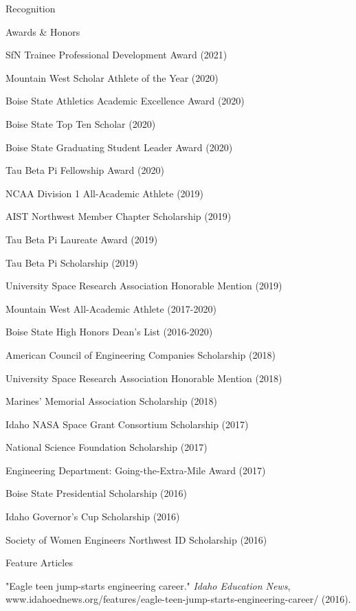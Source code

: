\documentclass{resume} %
\begin{document}
\newpage
\begin{rSection}{Recognition}
\begin{rSubsection2}{Awards \& Honors}{}{}{}
\item SfN Trainee Professional Development Award (2021)
\item Mountain West Scholar Athlete of the Year (2020)
\item Boise State Athletics Academic Excellence Award (2020) 
\item Boise State Top Ten Scholar (2020)
\item Boise State Graduating Student Leader Award (2020)
\item Tau Beta Pi Fellowship Award (2020)
\item NCAA Division 1 All-Academic Athlete (2019) 
\item AIST Northwest Member Chapter Scholarship (2019)
\item Tau Beta Pi Laureate Award (2019)
\item Tau Beta Pi Scholarship (2019)
\item University Space Research Association Honorable Mention (2019)
\item Mountain West All-Academic Athlete (2017-2020)
\item Boise State High Honors Dean’s List (2016-2020)
\item American Council of Engineering Companies Scholarship (2018)
\item University Space Research Association Honorable Mention (2018)
\item Marines’ Memorial Association Scholarship (2018)
\item Idaho NASA Space Grant Consortium Scholarship (2017)
\item National Science Foundation Scholarship (2017)
\item Engineering Department: Going-the-Extra-Mile Award (2017)
\item Boise State Presidential Scholarship (2016)
\item Idaho Governor’s Cup Scholarship (2016)
\item Society of Women Engineers Northwest ID Scholarship (2016)
\end{rSubsection2}
\begin{rSubsection3}{Feature Articles}{}{}{}
\item "Eagle teen jump-starts engineering career." \textit{Idaho Education News}, www.idahoednews.org/features/eagle-teen-jump-starts-engineering-career/ (2016).

\end{rSubsection3}
\end{rSection}
\end{document}

